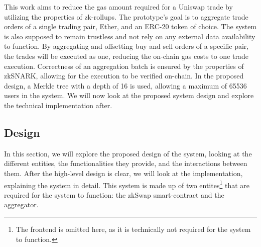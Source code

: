 \documentclass[../../thesis.tex]{subfiles}
\begin{document}
This work aims to reduce the gas amount required for a Uniswap trade by utilizing the properties of zk-rollups. The prototype's goal is to aggregate trade orders of a single trading pair, Ether, and an ERC-20 token of choice. The system is also supposed to remain trustless and not rely on any external data availability to function. By aggregating and offsetting buy and sell orders of a specific pair, the trades will be executed as one, reducing the on-chain gas costs to one trade execution. Correctness of an aggregation batch is ensured by the properties of zkSNARK, allowing for the execution to be verified on-chain. In the proposed design, a Merkle tree with a depth of 16 is used, allowing a maximum of 65536 users in the system. We will now look at the proposed system design and explore the technical implementation after. 








\subsection{Design}
In this section, we will explore the proposed design of the system, looking at the different entities, the functionalities they provide, and the interactions between them. After the high-level design is clear, we will look at the implementation, explaining the system in detail. This system is made up of two entites\footnote{The frontend is omitted here, as it is technically not required for the system to function.} that are required for the system to function: the zkSwap smart-contract and the aggregator.
\end{document}
